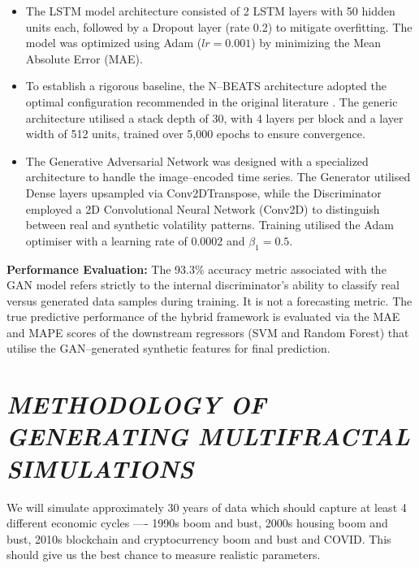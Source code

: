 \documentclass[12pt,a4paper]{report}
\numberwithin{equation}{section}
\begin{document}
\begin{itemize}
    \item {} The LSTM model architecture consisted of 2 LSTM layers with 50 hidden units each, followed by a Dropout layer (rate 0.2) to mitigate overfitting. The model was optimized using Adam ($lr=0.001$) by minimizing the Mean Absolute Error (MAE).

    \item {} To establish a rigorous baseline, the N--BEATS architecture adopted the optimal configuration recommended in the original literature \cite{oreshkin2019nbeats_51}. The generic architecture utilised a stack depth of 30, with 4 layers per block and a layer width of 512 units, trained over 5,000 epochs to ensure convergence.

    \item {} The Generative Adversarial Network was designed with a specialized architecture to handle the image--encoded time series. The Generator utilised Dense layers upsampled via Conv2DTranspose, while the Discriminator employed a 2D Convolutional Neural Network (Conv2D) to distinguish between real and synthetic volatility patterns. Training utilised the Adam optimiser with a learning rate of 0.0002 and $\beta_1=0.5$.
\end{itemize}

\textbf{Performance Evaluation:}
The 93.3\% accuracy metric associated with the GAN model refers strictly to the internal discriminator's ability to classify real versus generated data samples during training. It is not a forecasting metric. The true predictive performance of the hybrid framework is evaluated via the MAE and MAPE scores of the downstream regressors (SVM and Random Forest) that utilise the GAN--generated synthetic features for final prediction.
\hypertarget{methodology--of--generating--multifractal--simulations}{%
\section{\texorpdfstring{\emph{\textbf{METHODOLOGY OF GENERATING
MULTIFRACTAL
SIMULATIONS}}}{METHODOLOGY OF GENERATING MULTIFRACTAL SIMULATIONS}}\label{methodology--of--generating--multifractal--simulations}}

We will simulate approximately 30 years of data which should capture at
least 4 different economic cycles ---- 1990s boom and bust, 2000s housing
boom and bust, 2010s blockchain and cryptocurrency boom and bust and
COVID. This should give us the best chance to measure realistic
parameters.
\end{document}
